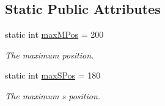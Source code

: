 \subsection*{Static Public Attributes}
\begin{DoxyCompactItemize}
\item 
\hypertarget{class_l_i_d_a_r___w_p_f___t_e_s_t_1_1_measurement_a9605c77615e3be20ae9b2bcb0c3840c7}{}static int \hyperlink{class_l_i_d_a_r___w_p_f___t_e_s_t_1_1_measurement_a9605c77615e3be20ae9b2bcb0c3840c7}{max\+M\+Pos} = 200\label{class_l_i_d_a_r___w_p_f___t_e_s_t_1_1_measurement_a9605c77615e3be20ae9b2bcb0c3840c7}

\begin{DoxyCompactList}\small\item\em The maximum position. \end{DoxyCompactList}\item 
\hypertarget{class_l_i_d_a_r___w_p_f___t_e_s_t_1_1_measurement_accc77dac11b21627a3e99fb7c1c0a048}{}static int \hyperlink{class_l_i_d_a_r___w_p_f___t_e_s_t_1_1_measurement_accc77dac11b21627a3e99fb7c1c0a048}{max\+S\+Pos} = 180\label{class_l_i_d_a_r___w_p_f___t_e_s_t_1_1_measurement_accc77dac11b21627a3e99fb7c1c0a048}

\begin{DoxyCompactList}\small\item\em The maximum s position. \end{DoxyCompactList}\end{DoxyCompactItemize}
